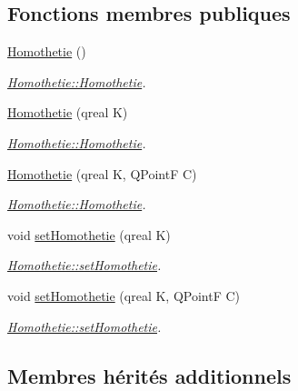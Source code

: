 \subsection*{Fonctions membres publiques}
\begin{DoxyCompactItemize}
\item 
\hypertarget{class_homothetie_a0c2ab7e4afc80bf76f10d6cecc2891fe}{}\hyperlink{class_homothetie_a0c2ab7e4afc80bf76f10d6cecc2891fe}{Homothetie} ()\label{class_homothetie_a0c2ab7e4afc80bf76f10d6cecc2891fe}

\begin{DoxyCompactList}\small\item\em \hyperlink{class_homothetie_a0c2ab7e4afc80bf76f10d6cecc2891fe}{Homothetie\+::\+Homothetie}. \end{DoxyCompactList}\item 
\hyperlink{class_homothetie_ab9e23a5bfa3141fde6951a4eec5cbe6e}{Homothetie} (qreal K)
\begin{DoxyCompactList}\small\item\em \hyperlink{class_homothetie_a0c2ab7e4afc80bf76f10d6cecc2891fe}{Homothetie\+::\+Homothetie}. \end{DoxyCompactList}\item 
\hyperlink{class_homothetie_a18b4271dabd8771540007efe8389827a}{Homothetie} (qreal K, Q\+Point\+F C)
\begin{DoxyCompactList}\small\item\em \hyperlink{class_homothetie_a0c2ab7e4afc80bf76f10d6cecc2891fe}{Homothetie\+::\+Homothetie}. \end{DoxyCompactList}\item 
void \hyperlink{class_homothetie_aa522cc6acd7c5822a67dde17e406da3c}{set\+Homothetie} (qreal K)
\begin{DoxyCompactList}\small\item\em \hyperlink{class_homothetie_aa522cc6acd7c5822a67dde17e406da3c}{Homothetie\+::set\+Homothetie}. \end{DoxyCompactList}\item 
void \hyperlink{class_homothetie_a759ed4ea817426a6f9aff78986b78bd1}{set\+Homothetie} (qreal K, Q\+Point\+F C)
\begin{DoxyCompactList}\small\item\em \hyperlink{class_homothetie_aa522cc6acd7c5822a67dde17e406da3c}{Homothetie\+::set\+Homothetie}. \end{DoxyCompactList}\end{DoxyCompactItemize}
\subsection*{Membres hérités additionnels}


